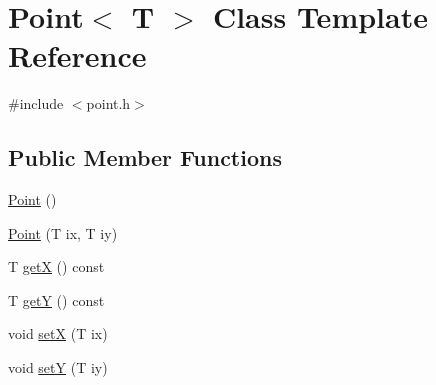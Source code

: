 \hypertarget{class_point}{\section{Point$<$ T $>$ Class Template Reference}
\label{class_point}
}


{\ttfamily \#include $<$point.\-h$>$}

\subsection*{Public Member Functions}
\begin{DoxyCompactItemize}
\item 
\hyperlink{class_point_aea76b1130f1a203722d8f2254ced8e66}{Point} ()
\item 
\hyperlink{class_point_a16ffb6ca96dca42871235bb5d0735c1e}{Point} (T ix, T iy)
\item 
T \hyperlink{class_point_ae414e3bdd4f00190e7c4a999e9020f6c}{get\-X} () const 
\item 
T \hyperlink{class_point_a6b5641f2ef6c44b88f14276150dce919}{get\-Y} () const 
\item 
void \hyperlink{class_point_a5bc38f3c20a363567bd3e4ec7f84355d}{set\-X} (T ix)
\item 
void \hyperlink{class_point_a9be128a556a05af596e0d98e710e0733}{set\-Y} (T iy)
\end{DoxyCompactItemize}
